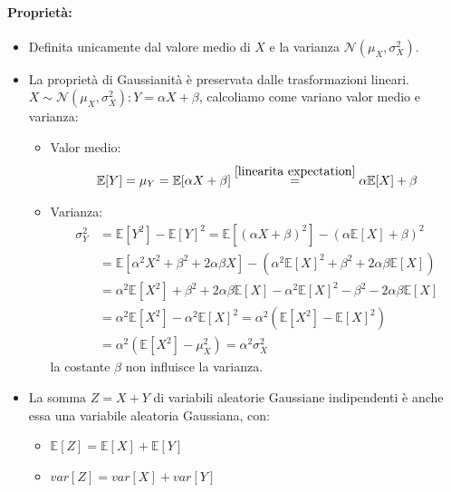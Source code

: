             \paragraph{Proprietà:}\label{proprietà distr gaussiana}
            \begin{itemize}
                \item {Definita unicamente dal valore medio di $X$ e la varianza $\mathcal{N}(\mu_X,\sigma_X^2)$.}
                \item {\begin{sloppypar}
                    La proprietà di Gaussianità è preservata dalle trasformazioni lineari. ${X \sim \mathcal{N}(\mu_X,\sigma_X^2): Y = \alpha X+\beta}$, calcoliamo come variano 
                    valor medio e varianza:
                \end{sloppypar}
                    \begin{itemize}
                        \item {Valor medio:
                            \[
                                \mathbb{E}[Y] = \mu_Y = \mathbb{E}[\alpha X+\beta]  \overset{\ref{linearita expectation}}{=} \alpha \mathbb{E}[X] + \beta
                            \]
                        }
                        \item {Varianza:
                            \begin{align}
                                \sigma_Y^2  &= \mathbb{E}[Y^2] -\mathbb{E}[Y]^2 =\mathbb{E}[(\alpha X + \beta)^2] -(\alpha \mathbb{E}[X] + \beta)^2 \nonumber \\
                                            &= \mathbb{E}[\alpha^2 X^2 + \beta^2 +2\alpha\beta X] -(\alpha^2 \mathbb{E}[X]^2 + \beta^2 +2\alpha\beta\mathbb{E}[X])\nonumber \\
                                            &= \alpha^2 \mathbb{E}[X^2] + \beta^2 +2\alpha\beta \mathbb{E}[X] -\alpha^2 \mathbb{E}[X]^2 - \beta^2 -2\alpha\beta\mathbb{E}[X]\nonumber \\
                                            &= \alpha^2 \mathbb{E}[X^2] -\alpha^2 \mathbb{E}[X]^2 = \alpha^2 (\mathbb{E}[X^2] -\mathbb{E}[X]^2)\nonumber \\
                                            &= \alpha^2 (\mathbb{E}[X^2] -\mu_X^2)=\alpha^2 \sigma_X^2\nonumber
                            \end{align}                         
                            la costante $\beta$ non influisce la varianza.  
                        }
                    \end{itemize}}
                \item {La somma $Z = X+Y$ di variabili aleatorie Gaussiane indipendenti è anche essa una variabile aleatoria
                    Gaussiana, con:
                        \begin{itemize}
                            \item {$\mathbb{E}[Z] = \mathbb{E}[X] +\mathbb{E}[Y] $}
                            \item {$var[Z] = var[X] +var[Y] $}
                        \end{itemize}}
            \end{itemize}
